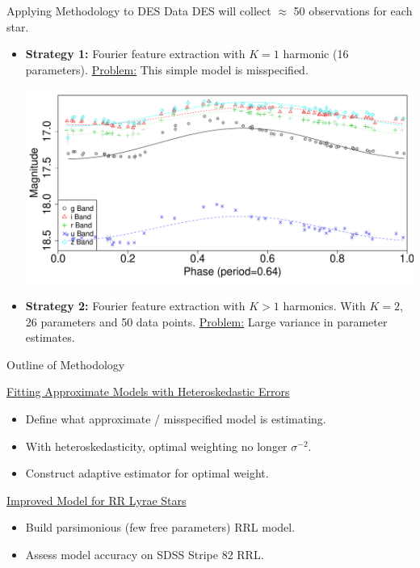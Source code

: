 \documentclass[12pt]{beamer}
\begin{document}
\begin{frame}{Applying Methodology to DES Data}
  DES will collect $\approx$ 50 observations for each star.

  \begin{itemize}
    \item \textbf{Strategy 1:} Fourier feature extraction with $K=1$ harmonic (16 parameters). \underline{Problem:} This simple model is misspecified.

  \begin{center}
    \includegraphics[scale=.25]{figs/rrlyrae_model_fit_sine.pdf}
  \end{center}

\item \textbf{Strategy 2:} Fourier feature extraction with $K>1$ harmonics. With $K=2$, 26 parameters and 50 data points. \underline{Problem:} Large variance in parameter estimates.
  \end{itemize}
\end{frame}


\begin{frame}{Outline of Methodology}

\underline{Fitting Approximate Models with Heteroskedastic Errors}\\
\begin{itemize}
\item Define what approximate / misspecified model is estimating.
\item With heteroskedasticity, optimal weighting no longer $\sigma^{-2}$.
\item Construct adaptive estimator for optimal weight.
\end{itemize}


\vspace{.2in}

\underline{Improved Model for RR Lyrae Stars}
\begin{itemize}
\item Build parsimonious (few free parameters) RRL model.
\item Assess model accuracy on SDSS Stripe 82 RRL.
\end{itemize}

\end{frame}
\end{document}
